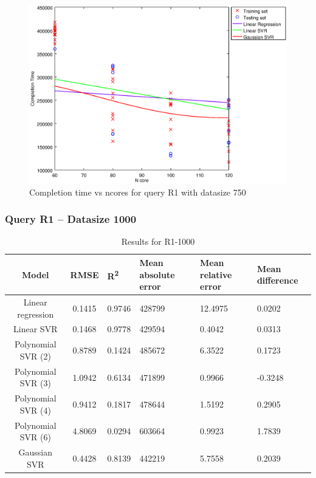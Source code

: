 \documentclass[a4paper,11pt]{article}
\begin{document}
\begin {figure}[hbtp]
\centering
\includegraphics[width=\textwidth]{output/R1_750_LINEAR_NCORE/plot_R1_750_bestmodels.eps}
\caption{Completion time vs ncores for query R1 with datasize 750}
\label{fig:all_linear_R1_750}
\end {figure}

\newpage
\subsubsection{Query R1 -- Datasize 1000}
\begin{table}[H]
	\centering
	\begin{adjustbox}{center}
		\begin{tabular}{c | c M{1.2cm} M{2.5cm} M{2.5cm} M{1.8cm}}
			Model & RMSE & R\textsuperscript{2} & Mean absolute error & Mean relative error & Mean difference \tabularnewline
			\hline
			Linear regression & 0.1415 & 0.9746 & 428799 & 12.4975 & 0.0202 \\
			Linear SVR & 0.1468 & 0.9778 & 429594 & 0.4042 & 0.0313 \\
			Polynomial SVR (2) & 0.8789 & 0.1424 & 485672 & 6.3522 & 0.1723 \\
			Polynomial SVR (3) & 1.0942 & 0.6134 & 471899 & 0.9966 & -0.3248 \\
			Polynomial SVR (4) & 0.9412 & 0.1817 & 478644 & 1.5192 & 0.2905 \\
			Polynomial SVR (6) & 4.8069 & 0.0294 & 603664 & 0.9923 & 1.7839 \\
			Gaussian SVR & 0.4428 & 0.8139 & 442219 & 5.7558 & 0.2039 \\
		\end{tabular}
	\end{adjustbox}
	\\
	\caption{Results for R1-1000}
	\label{fig:all_linear_R1_1000}
\end{table}
\end{document}
